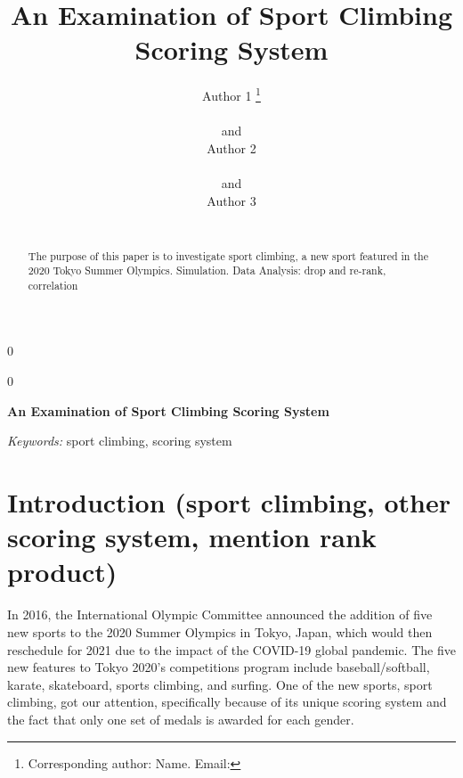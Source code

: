 \documentclass[12pt]{article}
\newcommand{\blind}{0}
\begin{document}
\def\spacingset#1{\renewcommand{\baselinestretch}%
{#1}\small\normalsize} \spacingset{1}



\blind
{
  \title{\bf An Examination of Sport Climbing Scoring System}

  \author{
        Author 1 \thanks{Corresponding author: Name. Email:} \\
    \\
     and \\     Author 2 \\
    \\
     and \\     Author 3 \\
    \\
      }
  \maketitle
} \fi

\blind
{
  \bigskip
  \bigskip
  \bigskip
  \begin{center}
    {\LARGE\bf An Examination of Sport Climbing Scoring System}
  \end{center}
  \medskip
} \fi

\bigskip
\begin{abstract}
The purpose of this paper is to investigate sport climbing, a new sport
featured in the 2020 Tokyo Summer Olympics. Simulation. Data Analysis:
drop and re-rank, correlation
\end{abstract}

\noindent%
{\it Keywords:} sport climbing, scoring system
\vfill

\newpage
\spacingset{1.45} %

\normalsize

\hypertarget{introduction-sport-climbing-other-scoring-system-mention-rank-product}{%
\section{Introduction (sport climbing, other scoring system, mention
rank
product)}\label{introduction-sport-climbing-other-scoring-system-mention-rank-product}}

In 2016, the International Olympic Committee announced the addition of
five new sports to the 2020 Summer Olympics in Tokyo, Japan, which would
then reschedule for 2021 due to the impact of the COVID-19 global
pandemic. The five new features to Tokyo 2020's competitions program
include baseball/softball, karate, skateboard, sports climbing, and
surfing. One of the new sports, sport climbing, got our attention,
specifically because of its unique scoring system and the fact that only
one set of medals is awarded for each gender.
\end{document}
